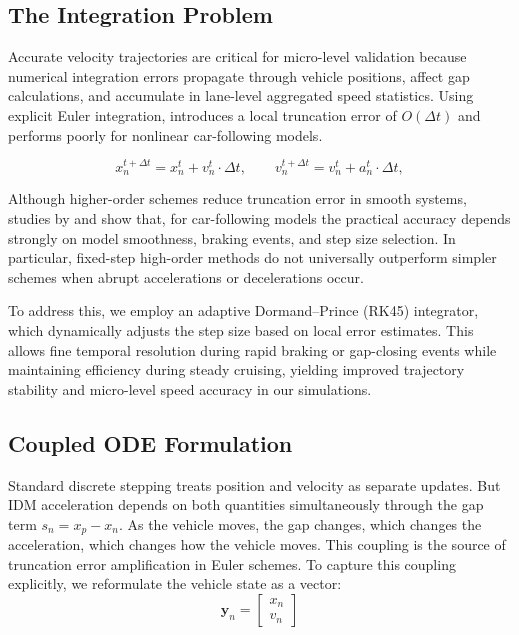 \documentclass{scspaperproc}
\theoremstyle{scsthe}
\begin{document}
    \subsection{The Integration Problem}
    Accurate velocity trajectories are critical for micro-level validation because numerical integration errors propagate through vehicle positions, affect gap calculations, and accumulate in lane-level aggregated speed statistics. Using explicit Euler integration, introduces a local truncation error of $O(\Delta t)$ and performs poorly for nonlinear
    car-following models.

    \begin{equation}
        x_n^{t+\Delta t} = x_n^t + v_n^t \cdot \Delta t,
        \qquad
        v_n^{t+\Delta t} = v_n^t + a_n^t \cdot \Delta t,
    \end{equation}



    Although higher-order schemes reduce truncation error in smooth systems, studies by \cite{treiber2015comparing} and \cite{pvrikryl2017comparing} show that, for car-following models the practical accuracy
    depends strongly on model smoothness, braking events, and step size selection.
    In particular, fixed-step high-order methods do not universally outperform simpler
    schemes when abrupt accelerations or decelerations occur.

    To address this, we employ an adaptive Dormand–Prince (RK45) integrator, which dynamically
    adjusts the step size based on local error estimates. This allows fine temporal resolution
    during rapid braking or gap-closing events while maintaining efficiency during steady
    cruising, yielding improved trajectory stability and micro-level speed accuracy in our
    simulations.

    \subsection{Coupled ODE Formulation}
    Standard discrete stepping treats position and velocity as separate updates. But IDM acceleration depends on both quantities simultaneously through the gap term $s_n = x_p - x_n$. As the vehicle moves, the gap changes, which changes the acceleration, which changes how the vehicle moves. This coupling is the source of truncation error amplification in Euler schemes.
    To capture this coupling explicitly, we reformulate the vehicle state as a vector:
    \begin{equation}
        \mathbf{y}_n = \begin{bmatrix} x_n \\ v_n \end{bmatrix}
    \end{equation}
\end{document}
